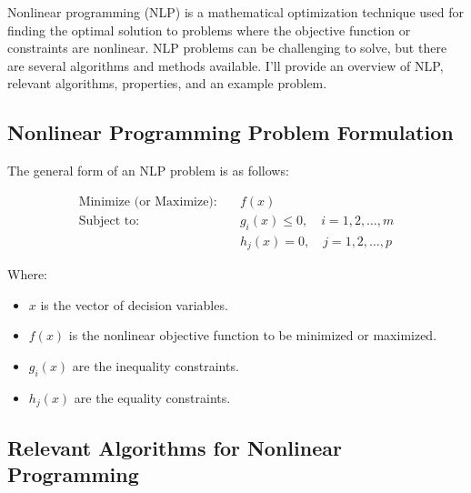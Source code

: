 \documentclass[a4paper]{article}
\begin{document}
Nonlinear programming (NLP) is a mathematical optimization technique used for finding the optimal solution to problems where the objective function or constraints are nonlinear. NLP problems can be challenging to solve, but there are several algorithms and methods available. I'll provide an overview of NLP, relevant algorithms, properties, and an example problem.

\subsection{Nonlinear Programming Problem Formulation}

The general form of an NLP problem is as follows:

\begin{align*}
\text{Minimize (or Maximize):} \quad & f(x) \\
\text{Subject to:} \quad & g_i(x) \leq 0, \quad i = 1, 2, \ldots, m \\
& h_j(x) = 0, \quad j = 1, 2, \ldots, p
\end{align*}

Where:
\begin{itemize}
\item \(x\) is the vector of decision variables.
\item \(f(x)\) is the nonlinear objective function to be minimized or maximized.
\item \(g_i(x)\) are the inequality constraints.
\item \(h_j(x)\) are the equality constraints.
\end{itemize}

\subsection{Relevant Algorithms for Nonlinear Programming}
\end{document}
